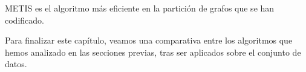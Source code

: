 METIS es el algoritmo más eficiente en la partición de grafos que se han codificado.

Para finalizar este capítulo, veamos una comparativa entre los algoritmos que hemos analizado en
las secciones previas, tras ser aplicados sobre el conjunto de datos.